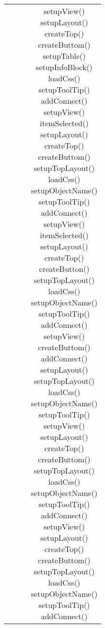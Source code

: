 \begin{center}
\begin{longtable}{|c|c|c|c|}
& & & \parbox[t]{\dimTipo} {  setupView() \\ setupLayout() \\ createTop() \\ createButtom() \\ setupTable() \\ setupInfoBlock() \\ loadCss() \\ setupToolTip() \\ addConnect() \\ setupView() \\ itemSelected() \\ setupLayout() \\ createTop() \\ createButtom() \\ setupTopLayout() \\ loadCss() \\ setupObjectName() \\ setupToolTip() \\ addConnect() \\ setupView() \\ itemSelected() \\ setupLayout() \\ createTop() \\ createButton() \\ setupTopLayout() \\ loadCss() \\ setupObjectName() \\ setupToolTip() \\ addConnect() \\ setupView() \\ createButtom() \\ addConnect() \\ setupLayout() \\ setupTopLayout() \\ loadCss() \\ setupObjectName() \\ setupToolTip() \\ setupView() \\ setupLayout() \\ createTop() \\createButtom() \\ setupTopLayout() \\ loadCss() \\ setupObjectName() \\ setupToolTip() \\ addConnect() \\ setupView() \\ setupLayout() \\ createTop() \\ createButtom() \\ setupTopLayout() \\ loadCss() \\ setupObjectName() \\ setupToolTip() \\ addConnect() \\  }\\


\end{longtable}
\end{center}
